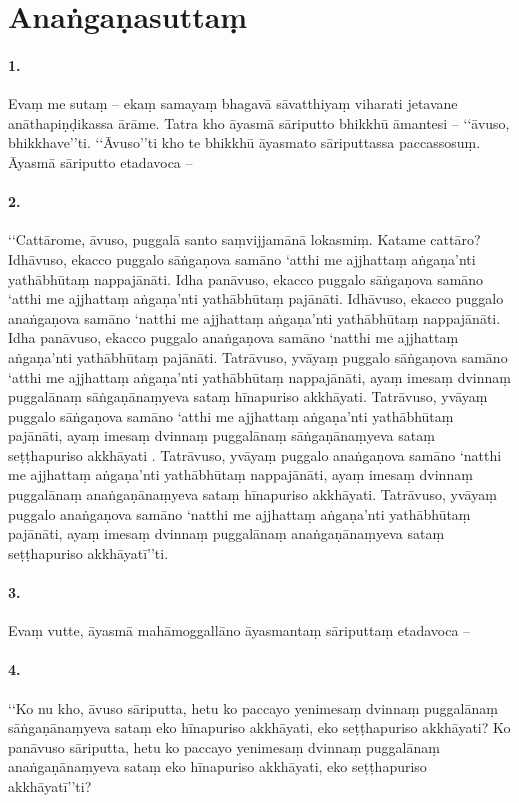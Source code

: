 \section{Anaṅgaṇasuttaṃ}

\paragraph{1.} Evaṃ me sutaṃ – ekaṃ samayaṃ bhagavā sāvatthiyaṃ viharati jetavane anāthapiṇḍikassa ārāme. Tatra kho āyasmā sāriputto bhikkhū āmantesi – ‘‘āvuso, bhikkhave’’ti. ‘‘Āvuso’’ti kho te bhikkhū āyasmato sāriputtassa paccassosuṃ. Āyasmā sāriputto etadavoca –

\paragraph{2.} ‘‘Cattārome, āvuso, puggalā santo saṃvijjamānā lokasmiṃ. Katame cattāro? Idhāvuso, ekacco puggalo sāṅgaṇova samāno ‘atthi me ajjhattaṃ aṅgaṇa’nti yathābhūtaṃ nappajānāti. Idha panāvuso, ekacco puggalo sāṅgaṇova samāno ‘atthi me ajjhattaṃ aṅgaṇa’nti yathābhūtaṃ pajānāti. Idhāvuso, ekacco puggalo anaṅgaṇova samāno ‘natthi me ajjhattaṃ aṅgaṇa’nti yathābhūtaṃ nappajānāti. Idha panāvuso, ekacco puggalo anaṅgaṇova samāno ‘natthi me ajjhattaṃ aṅgaṇa’nti yathābhūtaṃ pajānāti. Tatrāvuso, yvāyaṃ puggalo sāṅgaṇova samāno ‘atthi me ajjhattaṃ aṅgaṇa’nti yathābhūtaṃ nappajānāti, ayaṃ imesaṃ dvinnaṃ puggalānaṃ sāṅgaṇānaṃyeva sataṃ hīnapuriso akkhāyati. Tatrāvuso, yvāyaṃ puggalo sāṅgaṇova samāno ‘atthi me ajjhattaṃ aṅgaṇa’nti yathābhūtaṃ pajānāti, ayaṃ imesaṃ dvinnaṃ puggalānaṃ sāṅgaṇānaṃyeva sataṃ seṭṭhapuriso akkhāyati . Tatrāvuso, yvāyaṃ puggalo anaṅgaṇova samāno ‘natthi me ajjhattaṃ aṅgaṇa’nti yathābhūtaṃ nappajānāti, ayaṃ imesaṃ dvinnaṃ puggalānaṃ anaṅgaṇānaṃyeva sataṃ hīnapuriso akkhāyati. Tatrāvuso, yvāyaṃ puggalo anaṅgaṇova samāno ‘natthi me ajjhattaṃ aṅgaṇa’nti yathābhūtaṃ pajānāti, ayaṃ imesaṃ dvinnaṃ puggalānaṃ anaṅgaṇānaṃyeva sataṃ seṭṭhapuriso akkhāyatī’’ti.

\paragraph{3.} Evaṃ vutte, āyasmā mahāmoggallāno āyasmantaṃ sāriputtaṃ etadavoca –

\paragraph{4.} ‘‘Ko nu kho, āvuso sāriputta, hetu ko paccayo yenimesaṃ dvinnaṃ puggalānaṃ sāṅgaṇānaṃyeva sataṃ eko hīnapuriso akkhāyati, eko seṭṭhapuriso akkhāyati? Ko panāvuso sāriputta, hetu ko paccayo yenimesaṃ dvinnaṃ puggalānaṃ anaṅgaṇānaṃyeva sataṃ eko hīnapuriso akkhāyati, eko seṭṭhapuriso akkhāyatī’’ti?

